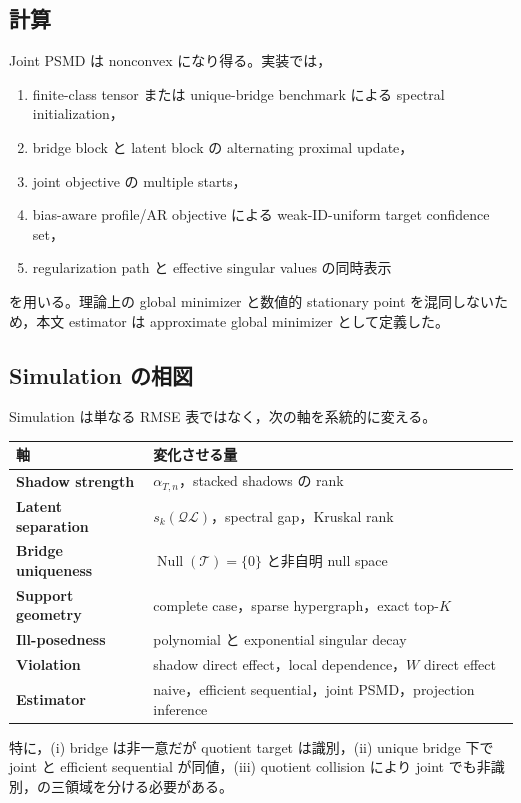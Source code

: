 \documentclass[11pt,a4paper]{ltjsarticle}
\theoremstyle{remark}
\newcommand{\Top}{\mathscr T}
\newcommand{\Lop}{\mathscr L}
\newcommand{\Qop}{\mathscr Q}
\newcommand{\Null}{\operatorname{Null}}
\begin{document}
\subsection{計算}
Joint PSMD は nonconvex になり得る。実装では，
\begin{enumerate}[label=(\roman*)]
\item finite-class tensor または unique-bridge benchmark による spectral initialization，
\item bridge block と latent block の alternating proximal update，
\item joint objective の multiple starts，
\item bias-aware profile/AR objective による weak-ID-uniform target confidence set，
\item regularization path と effective singular values の同時表示
\end{enumerate}
を用いる。理論上の global minimizer と数値的 stationary point を混同しないため，本文 estimator は approximate global minimizer として定義した。

\subsection{Simulation の相図}
Simulation は単なる RMSE 表ではなく，次の軸を系統的に変える。
\begin{center}
\begin{tabularx}{0.96\textwidth}{>{\bfseries}p{36mm}X}
\toprule
軸 & 変化させる量\\
\midrule
Shadow strength & $\alpha_{T,n}$，stacked shadows の rank\\
Latent separation & $s_k(\Qop\Lop)$，spectral gap，Kruskal rank\\
Bridge uniqueness & $\Null(\Top)=\{0\}$ と非自明 null space\\
Support geometry & complete case，sparse hypergraph，exact top-$K$\\
Ill-posedness & polynomial と exponential singular decay\\
Violation & shadow direct effect，local dependence，$W$ direct effect\\
Estimator & naive，efficient sequential，joint PSMD，projection inference\\
\bottomrule
\end{tabularx}
\end{center}
特に，(i) bridge は非一意だが quotient target は識別，(ii) unique bridge 下で joint と efficient sequential が同値，(iii) quotient collision により joint でも非識別，の三領域を分ける必要がある。
\end{document}
